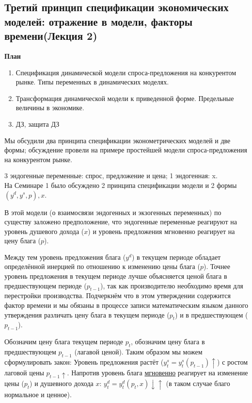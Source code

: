 \documentclass[12pt,a4paper]{article}
\author{Аверьянов Т.С.}
\begin{document}
\begin{center}
\section*{Третий принцип спецификации экономических моделей: отражение в модели, факторы времени(Лекция 2)}
\end{center}
\begin{center}
\textbf{План}
\end{center}
\begin{enumerate}
\item Спецификация динамической модели спроса-предложения на конкурентом рынке. Типы переменных в динамических моделях.
\item Трансформация динамической модели к приведенной форме. Предельные величины в экономике. 
\item ДЗ, защита ДЗ
\end{enumerate}

Мы обсудили два принципа спецификации эконометрических моделей и две формы; обсуждение провели на примере простейшей модели спроса-предложения на конкурентом рынке.

3 эндогенные переменные: спрос, предложение и цена; 1 эндогенная: x. \\
На Семинаре 1 было обсуждено 2 принципа спецификации модели и 2 формы $(y^d, y^s, p), x$.

В этой модели (о взаимосвязи эндогенных  и экзогенных переменных) по существу заложено предположение, что эндогенные переменные реагируют на уровень душевого дохода ($x$) и уровень предложения мгновенно реагирует на цену блага ($p$).

Между тем уровень предложения блага ($y^d$) в текущем периоде обладает определённой инерцией по отношению к изменению цены блага ($p$). Точнее уровень предложения в текущем периоде лучше объясняется ценой блага в предшествующем периоде ($p_{t-1}$), так как производителю необходимо время для перестройки производства. Подчеркнём что в этом утверждении содержится фактор времени и мы обязаны в процессе записи математическим языком данного утверждения различать цену блага в текущем периоде ($p_t$) и в предшествующем ($p_{t-1}$).
 
Обозначим цену блага текущем периоде $p_t$, обозначим цену блага в предшествующем $p_{t-1}$ (лагавой ценой). Таким образом мы можем сформулировать закон: Уровень предложения растёт ($y_t^s = y_t^s(p_{t-1})\uparrow$) с ростом лаговой цены $p_{t-1} \uparrow$. Напротив уровень блага \underline{мгновенно} реагирует на изменение цены ($p_t$) и душевного дохода $x$: $y_t^d = y_t^d(p_t, x)\downarrow \uparrow$ (в таком случае благо нормальное и ценное).
\end{document}

